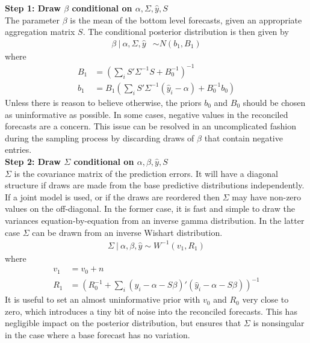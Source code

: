 \documentclass[a4paper,fleqn,11pt]{article}
\begin{document}
\noindent\textbf{Step 1: Draw $\beta$ conditional on $\alpha,\Sigma,\hat{y},S$}\\
The parameter $\beta$ is the mean of the bottom level forecasts, given an appropriate aggregation matrix $S$. The conditional posterior distribution is then given by
\begin{align}
\beta\ |\ \alpha,\Sigma,\hat{y} &\sim N(b_1,B_1)
\end{align}
where
\begin{align*}
B_1 &= \left(\sum_i S'\Sigma^{-1}S + B_0^{-1}\right)^{-1} \\
b_1 &= B_1 \left(\sum_i S'\Sigma^{-1} (\hat{y}_i - \alpha) + B_0^{-1}b_0\right)
\end{align*}
Unless there is reason to believe otherwise, the priors $b_0$ and $B_0$ should be chosen as uninformative as possible. In some cases, negative values in the reconciled forecasts are a concern. This issue can be resolved in an uncomplicated fashion during the sampling process by discarding draws of $\beta$ that contain negative entries.\\

\noindent\textbf{Step 2: Draw $\Sigma$ conditional on $\alpha,\beta,\hat{y},S$}\\
$\Sigma$ is the covariance matrix of the prediction errors. It will have a diagonal structure if draws are made from the base predictive distributions independently.  If a joint model is used, or if the draws are reordered then $\Sigma$ may have non-zero values on the off-diagonal.  In the former case, it is fast and simple to draw the variances equation-by-equation from an inverse gamma distribution.  In the latter case $\Sigma$ can be drawn from an inverse Wishart distribution.
\begin{align}
\Sigma\ |\ \alpha,\beta,\hat{y} \sim W^{-1}(v_1,R_1)
\end{align}
where
\begin{align*}
v_1 &= v_0 + n\\
R_1 &=  \left( R_0^{-1} + \sum_i (\hat{y}_i - \alpha - S \beta)'(\hat{y}_i - \alpha - S \beta) \right)^{-1}
\end{align*}
It is useful to set an almost uninformative prior with $v_0$ and $R_0$ very close to zero, which introduces a tiny bit of noise into the reconciled forecasts. This has negligible impact on the posterior distribution, but ensures that $\Sigma$ is nonsingular in the case where a base forecast has no variation. 
\end{document}
